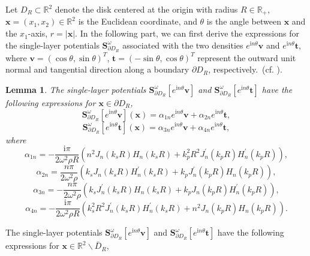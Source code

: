 \documentclass[10pt,reqno,oneside]{amsart}%
\newtheorem{lem}{Lemma}[section]
\theoremstyle{definition}
\theoremstyle{remark}
\numberwithin{equation}{section}
\numberwithin{equation}{section}
\begin{document}
Let $D_{R}\subset\mathbb{R}^{2}$ denote the disk centered at the origin with radius $R\in \mathbb{R}_{+}$, $\mathbf{x}=\left(x_{1},x_{2}\right)\in \mathbb{R}^{2}$ is the Euclidean coordinate, and $\theta$ is the angle between $\mathbf{x}$ and the $x_{1}$-axis, $r=|\mathbf{x}|$. In the following part, we can first derive the expressions for the single-layer potentials $\mathbf{S}_{\partial D_{R}}^{\omega}$ associated with the two densities $e^{\mathrm{i} n \theta} \boldsymbol{v}$ and $e^{\mathrm{i} n \theta} \boldsymbol{t}$, where $\boldsymbol{v}=(\cos\theta, \sin \theta)^{T}$, $\boldsymbol{t}=(-\sin\theta, \cos\theta)^{T}$ represent the outward unit normal and tangential direction along a boundary $\partial D_{R}$, respectively.~(cf. \cite{2Delasticspectrum}).
\begin{lem}\label{Spectrum1}
The single-layer potentials $\mathbf{S}_{\partial D_{R}}^{\omega}\left[e^{\mathrm{i} n \theta} \boldsymbol{v}\right]$ and $\mathbf{S}_{\partial D_{R}}^{\omega}\left[e^{\mathrm{i} n \theta} \boldsymbol{t}\right]$ have the following expressions for $\mathbf{x} \in \partial D_{R}$,
$$
\mathbf{S}_{\partial D_{R}}^{\omega}\left[e^{\mathrm{i} n \theta} \boldsymbol{v}\right](\mathbf{x}) =\alpha_{1 n} e^{\mathrm{i} n \theta} \boldsymbol{v}+\alpha_{2 n} e^{\mathrm{i} n \theta} \boldsymbol{t},
$$
$$
\mathbf{S}_{\partial D_{R}}^{\omega}\left[e^{\mathrm{i} n \theta} \boldsymbol{t}\right](\mathbf{x}) =\alpha_{3 n} e^{\mathrm{i} n \theta} \boldsymbol{v}+\alpha_{4 n} e^{\mathrm{i} n \theta} \mathbf{t},
$$
where
$$
\alpha_{1 n}=-\frac{\mathrm{i} \pi}{2 \omega^{2} \rho R}\left(n^{2} J_{n}\left(k_{s} R\right) H_{n}\left(k_{s} R\right)+k_{p}^{2} R^{2} J_{n}^{\prime}\left(k_{p} R\right) H_{n}^{\prime}\left(k_{p} R\right)\right),
$$
$$
\alpha_{2 n}=\frac{n \pi}{2 \omega^{2} \rho}\left(k_{s} J_{n}\left(k_{s} R\right) H_{n}^{\prime}\left(k_{s} R\right)+k_{p} J_{n}^{\prime}\left(k_{p} R\right) H_{n}\left(k_{p} R\right)\right),
$$
$$
\alpha_{3 n}=-\frac{n \pi}{2 \omega^{2} \rho}\left(k_{s} J_{n}^{\prime}\left(k_{s} R\right) H_{n}\left(k_{s} R\right)+k_{p} J_{n}\left(k_{p} R\right) H_{n}^{\prime}\left(k_{p} R\right)\right),
$$
$$
\alpha_{4 n}=-\frac{\mathrm{i} \pi}{2 \omega^{2} \rho R}\left(k_{s}^{2} R^{2} J_{n}^{\prime}\left(k_{s} R\right) H_{n}^{\prime}\left(k_{s} R\right)+n^{2} J_{n}\left(k_{p} R\right) H_{n}\left(k_{p} R\right)\right).
$$
\end{lem}
The single-layer potentials $\mathbf{S}_{\partial D_{R}}^{\omega}\left[e^{\mathrm{i} n \theta} \boldsymbol{v}\right]$ and $\mathbf{S}_{\partial D_{R}}^{\omega}\left[e^{\mathrm{i} n \theta} \boldsymbol{t}\right]$ have the following expressions for $\mathbf{x} \in \mathbb{R}^{2} \backslash \bar{D}_{R}$,
\end{document}
